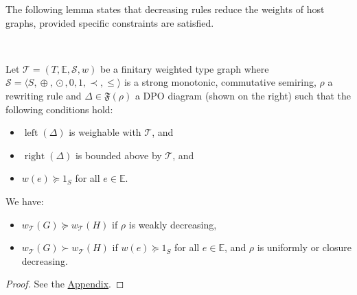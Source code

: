 The following lemma states that decreasing rules reduce the weights of host graphs, provided specific constraints are satisfied.
\begin{lemma}
    \label{lem:decreasing_step}
    \ \newline 
\begin{minipage}{0.7\textwidth}
    Let $\mathcal{T} \mathop{=} (T,\mathbb{E}, \mathcal{S}, w)$ be a finitary weighted type graph where $\mathcal{S} \mathop{=} \langle S, \mathop{\oplus}, \mathop{\odot}, 0, 1, \prec, \leq \rangle$ is a strong monotonic, commutative semiring, $\rho$ a rewriting rule and $\Delta \mathop{\in} \mathfrak{F}(\rho)$ a DPO diagram
    (shown on the right)   such that the following conditions hold:
\end{minipage}  
\begin{minipage}{0.3\textwidth}
    \begin{center}
      \end{center}
\end{minipage}
   \begin{itemize}
       \item $\operatorname{left}(\Delta)$ is weighable with \(\mathcal{T}\), and
       \item $\operatorname{right}(\Delta)$ is bounded above by \(\mathcal{T}\), and
       \item $w(e) \mathop{\succeq} 1_S$ for all $e \mathop{\in} \mathbb{E}$.
   \end{itemize}

   \noindent
  We have:
   \begin{itemize}
       \item $w_\mathcal{T}(G) \mathop{\succeq} w_\mathcal{T}(H)$ if $\rho$ is weakly decreasing,
       \item $w_\mathcal{T}(G) \mathop{\succ} w_\mathcal{T}(H)$ if $w(e) \mathop{\succeq} 1_S$ for all $e \mathop{\in} \mathbb{E}$, and $\rho$ is uniformly or closure decreasing.
   \end{itemize}
\end{lemma} 
\begin{proof}
   See the \hyperref[proof:decreasing_step]{Appendix}.
\end{proof}